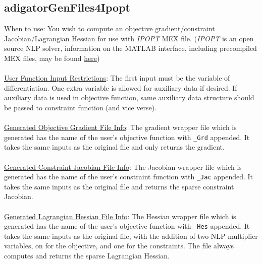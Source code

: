 \documentclass[10pt,pdftex]{article}
\begin{document}
\subsection{adigatorGenFiles4Ipopt}
\underline{When to use}: You wish to compute an objective gradient/constraint Jacobian/Lagrangian Hessian for use with \emph{IPOPT} MEX file. ({\em IPOPT} \cite{Biegler1,Biegler2} is an open source NLP solver, information on the MATLAB interface, including precompiled MEX files, may be found \href{http://projects.coin-or.org/Ipopt/wiki/MatlabInterface}{here})\\\\
\underline{User Function Input Restrictions}: The first input must be the variable of differentiation. One extra variable is allowed for auxiliary data if desired. If auxiliary data is used in objective function, same auxiliary data structure should be passed to constraint function (and vice verse).\\\\
\underline{Generated Objective Gradient File Info}: The gradient wrapper file which is generated has the name of the user's objective function with \texttt{\_Grd} appended. It takes the same inputs as the original file and only returns the gradient.\\\\
\underline{Generated Constraint Jacobian File Info}: The Jacobian wrapper file which is generated has the name of the user's constraint function with \texttt{\_Jac} appended. It takes the same inputs as the original file and returns the sparse constraint Jacobian.\\\\
\underline{Generated Lagrangian Hessian File Info}: The Hessian wrapper file which is generated has the name of the user's objective function with \texttt{\_Hes} appended. It takes the same inputs as the original file, with the addition of two NLP multiplier variables, on for the objective, and one for the constraints. The file always computes and returns the sparse Lagrangian Hessian.\\\\
\end{document}
